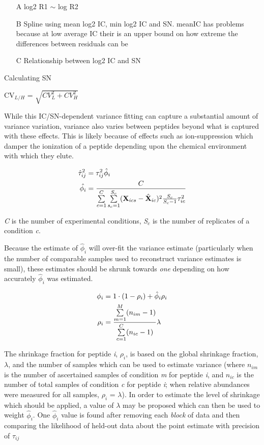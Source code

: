 \documentclass[12pt]{article}
\begin{document}
\color{red}
\begin{itemize}
\item[A] log2 R1 $\sim$ log R2
\item[B] Spline using mean log2 IC, min log2 IC and SN.
meanIC has problems because at low average IC their is an upper bound on how extreme the differences between residuals can be
\item[C] Relationship between log2 IC and SN
\end{itemize}

Calculating SN

CV$_{L/H}$ = $\sqrt{CV_{L}^{2} + CV_{H}^2}$

\color{black}


While this IC/SN-dependent variance fitting can capture a substantial amount of variance variation, variance also varies between peptides beyond what is captured with these effects.  This is likely because of effects such as ion-suppression which damper the ionization of a peptide depending upon the chemical environment with which they elute.  

\begin{align}
\hat{\tau}^{2}_{ij} &= \tau^{2}_{ij}\hat{\phi}_{i}\notag\\
\hat{\phi_{i}} &= \frac{C}{\sum\limits_{c = 1}^{C}\sum\limits_{s_{c} = 1}^{S_{c}}(\textbf{X}_{ics} - \hat{\textbf{X}}_{ic})^{2}\frac{S_{c}}{S_{c} - 1}\tau^{2}_{ic}}
\end{align}

\textit{C} is the number of experimental conditions, \textit{S}$_{c}$ is the number of replicates of a condition \textit{c}.

Because the estimate of $\hat{\phi}_{i}$ will over-fit the variance estimate (particularly when the number of comparable samples used to reconstruct variance estimates is small), these estimates should be shrunk towards \textit{one} depending on how accurately $\hat{\phi}_{i}$ was estimated.

\begin{align}
\phi_{i} &= 1\cdot(1-\rho_{i}) + \hat{\phi}_{i}\rho_{i}\notag\\
\rho_{i} &= \frac{\sum\limits_{m=1}^{M}(n_{im} - 1)}{\sum\limits_{c=1}^{C}(n_{ic} - 1)}\lambda
\end{align}

The shrinkage fraction for peptide \textit{i}, $\rho_{i}$, is based on the global shrinkage fraction, $\lambda$, and the number of samples which can be used to estimate variance (where $\textit{n}_{im}$ is the number of ascertained samples of condition \textit{m} for peptide \textit{i}, and $\textit{n}_{ic}$ is the number of total samples of condition \textit{c} for peptide \textit{i}; when relative abundances were measured for all samples, $\rho_{i}$ = $\lambda$).  In order to estimate the level of shrinkage which should be applied, a value of $\lambda$ may be proposed which can then be used to weight $\hat{\phi}_{i}$.  One $\hat{\phi}_{i}$ value is found after removing each \textit{block} of data and then comparing the likelihood of held-out data about the point estimate with precision of $\tau_{ij}$
\end{document}
